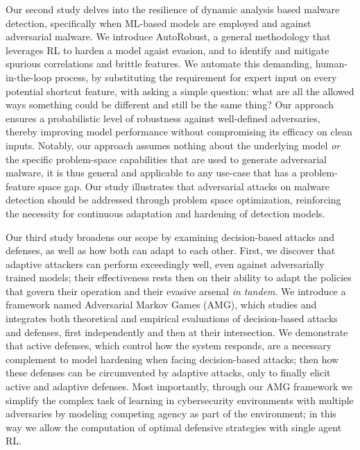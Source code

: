 Our second study delves into the resilience of dynamic analysis based  malware detection, specifically when ML-based models are employed and against adversarial malware.
We introduce AutoRobust, a general methodology that leverages \gls{RL} to harden a model agaist evasion, and to identify and mitigate spurious correlations and brittle features.
We automate this demanding, human-in-the-loop process, by substituting the requirement for expert input on every potential shortcut feature, with asking a simple question: what are all the allowed ways something could be different and still be the same thing?
Our approach ensures a probabilistic level of robustness against well-defined adversaries, thereby improving model performance without compromising its efficacy on clean inputs.
Notably, our approach assumes nothing about the underlying model \textit{or} the specific problem-space capabilities that are used to generate adversarial malware, it is thus general and applicable to any use-case that has a problem-feature space gap.
Our study illustrates that adversarial attacks on malware detection should be addressed through problem space optimization, reinforcing the necessity for continuous adaptation and hardening of detection models.

Our third study broadens our scope by examining decision-based attacks and defenses, as well as how both can adapt to each other.
First, we discover that adaptive attackers can perform exceedingly well, even against adversarially trained models; their effectiveness rests then on their ability to adapt the policies that govern their operation and their evasive arsenal \textit{in tandem}.
We introduce a framework named Adversarial Markov Games (AMG), which studies and integrates both theoretical and empirical evaluations of decision-based attacks and defenses, first independently and then at their intersection.
We demonstrate that active defenses, which control how the system responds, are a necessary complement
to model hardening when facing decision-based attacks; then how these defenses can be circumvented by adaptive attacks, only to finally elicit active and adaptive defenses.
Most importantly, through our AMG framework we simplify the complex task of learning in cybersecurity environments with multiple adversaries by modeling competing agency as part of the environment; in this way we allow the computation of optimal defensive strategies with single agent \gls{RL}.

